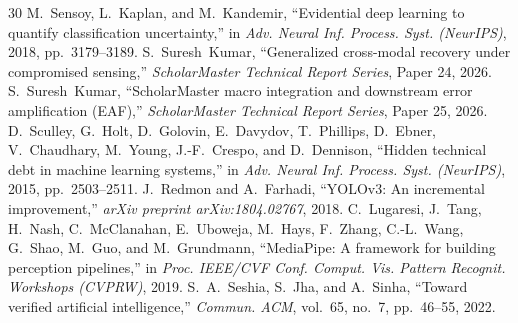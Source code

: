 \documentclass[10pt,journal,compsoc]{IEEEtran}
\begin{document}
\begin{thebibliography}{30}
 M.~Sensoy, L.~Kaplan, and M.~Kandemir, ``Evidential deep learning to quantify classification uncertainty,'' in \emph{Adv. Neural Inf. Process. Syst. (NeurIPS)}, 2018, pp.~3179--3189.
 S.~Suresh~Kumar, ``Generalized cross-modal recovery under compromised sensing,'' \emph{ScholarMaster Technical Report Series}, Paper 24, 2026.
 S.~Suresh~Kumar, ``ScholarMaster macro integration and downstream error amplification (EAF),'' \emph{ScholarMaster Technical Report Series}, Paper 25, 2026.
 D.~Sculley, G.~Holt, D.~Golovin, E.~Davydov, T.~Phillips, D.~Ebner, V.~Chaudhary, M.~Young, J.-F.~Crespo, and D.~Dennison, ``Hidden technical debt in machine learning systems,'' in \emph{Adv. Neural Inf. Process. Syst. (NeurIPS)}, 2015, pp.~2503--2511.
 J.~Redmon and A.~Farhadi, ``YOLOv3: An incremental improvement,'' \emph{arXiv preprint arXiv:1804.02767}, 2018.
 C.~Lugaresi, J.~Tang, H.~Nash, C.~McClanahan, E.~Uboweja, M.~Hays, F.~Zhang, C.-L.~Wang, G.~Shao, M.~Guo, and M.~Grundmann, ``MediaPipe: A framework for building perception pipelines,'' in \emph{Proc. IEEE/CVF Conf. Comput. Vis. Pattern Recognit. Workshops (CVPRW)}, 2019.
 S.~A.~Seshia, S.~Jha, and A.~Sinha, ``Toward verified artificial intelligence,'' \emph{Commun. ACM}, vol.~65, no.~7, pp.~46--55, 2022.
\end{thebibliography}
\end{document}
